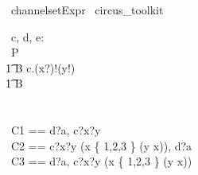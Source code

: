 \begin{zsection}
  \SECTION\ channelsetExpr \parents\ circus\_toolkit
\end{zsection}
%
%
\begin{circus}
	\circchannel\ c, d, e: \nat \cross \nat
	\\
	\circprocess\ P \circdef \circbegin \\
		\t1	B \circdef c.(x?)!(y!) \then \Skip \\
		\t1 \circspot B \\
	\circend	
 \\
	\\
	\circchannelset\ C1 == \lchanset d?a, c?x?y \rchanset 
	\\
	\circchannelset\ C2 == \lchanset c?x?y \prefixcolon (x \in \{ 1,2,3 \} \land (y \neq x)), d?a \rchanset 
	\\
	\circchannelset\ C3 == \lchanset d?a, c?x?y \prefixcolon (x \in \{ 1,2,3 \} \land (y \neq x)) \rchanset 
\end{circus}
